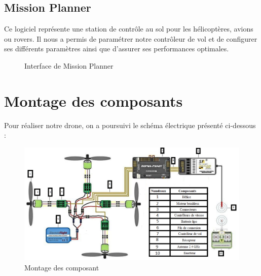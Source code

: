 	\subsection{Mission Planner	}
	Ce logiciel représente une station de contrôle au sol pour les hélicoptères, avions ou rovers. Il nous a permis de paramétrer notre contrôleur de vol et de configurer ses différents paramètres ainsi que d'assurer ses performances optimales.
	\begin{figure} [H]
		\begin{center}
			\centering
			\hspace*{1.5cm}
			\centering
			\hspace*{1.5cm}	\caption{Interface de Mission Planner}
		\end{center}
	\end{figure}
	
	\section{Montage des composants}
	Pour réaliser notre drone, on a poursuivi le schéma électrique présenté ci-dessous :
	
	\begin{figure} [H]
		\begin{center}
			\centering
			\hspace*{-1cm}\includegraphics[width=1.1\linewidth]{Images/Shéma électrique}
		\end{center}
		\caption{Montage des composant}
	\end{figure}
	
